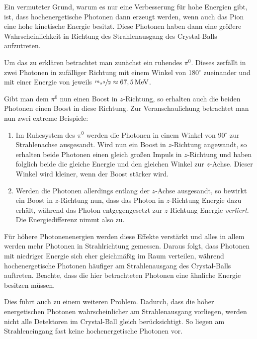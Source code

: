 \documentclass[a4paper,11pt,oneside,final,german,openbib,pdftex]{scrbook}
\begin{document}
{Ein vermuteter Grund, warum es nur eine Verbesserung für hohe Energien gibt, ist, dass hochenergetische Photonen dann erzeugt werden, wenn auch das Pion eine hohe kinetische Energie besitzt. Diese Photonen haben dann eine gr\"o{\ss}ere Wahrscheinlichkeit in Richtung des Strahlenausgang des Crystal-Balls aufzutreten.

Um das zu erkl\"aren betrachtet man zun\"achst ein ruhendes $\pi^0$. Dieses zerf\"allt in zwei Photonen in zuf\"alliger Richtung mit einem Winkel von 180$^{\circ}$ zueinander und mit einer Energie von jeweils $\nicefrac{m_{\pi^0}}{2} \approx67,5\, \text{MeV}$.

Gibt man dem $\pi^0$ nun einen Boost in $z$-Richtung, so erhalten auch die beiden Photonen einen Boost in diese Richtung.
Zur Veranschaulichung betrachtet man nun zwei extreme Beispiele:

\begin{enumerate}
	\item Im Ruhesystem des $\pi^0$ werden die Photonen in einem Winkel von 90$^{\circ}$ zur Strahlenachse ausgesandt. Wird nun ein Boost in $z$-Richtung angewandt, so erhalten beide Photonen einen gleich gro{\ss}en Impuls in $z$-Richtung und haben folglich beide die gleiche Energie und den gleichen Winkel zur $z$-Achse. Dieser Winkel wird kleiner, wenn der Boost st\"arker wird.
	\item Werden die Photonen allerdings entlang der $z$-Achse ausgesandt, so bewirkt ein Boost in $z$-Richtung nun, dass das Photon in $z$-Richtung Energie dazu erh\"alt, w\"ahrend das Photon entgegengesetzt zur $z$-Richtung Energie \textit{verliert}. Die Energiedifferenz nimmt also zu.
\end{enumerate}

F\"ur h\"ohere Photonenenergien werden diese Effekte verst\"arkt und alles in allem werden mehr Photonen in Strahlrichtung gemessen. Daraus folgt, dass Photonen mit niedriger Energie sich eher gleichm\"a{\ss}ig im Raum verteilen, w\"ahrend hochenergetische Photonen h\"aufiger am Strahlenausgang des Crystal-Balls auftreten. Beachte, dass die hier betrachteten Photonen eine ähnliche Energie besitzen müssen.

Dies f\"uhrt auch zu einem weiteren Problem. Dadurch, dass die h\"oher energetischen Photonen wahrscheinlicher am Strahlenausgang vorliegen, werden nicht alle Detektoren im Crystal-Ball gleich ber\"ucksichtigt. So liegen am Strahleneingang fast keine hochenergetische Photonen vor.


}
\end{document}
